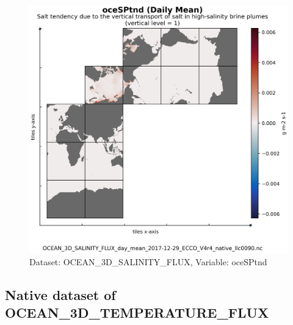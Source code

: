 \begin{figure}[H]
\centering
\includegraphics[scale=0.55]{../images/plots/native_plots/Ocean_Three-Dimensional_Salinity_Fluxes/oceSPtnd.png}
\caption{Dataset: OCEAN\_3D\_SALINITY\_FLUX, Variable: oceSPtnd}
\label{tab:table-OCEAN_3D_SALINITY_FLUX_oceSPtnd-Plot}
\end{figure}
\newpage
\subsection{Native dataset of OCEAN\_3D\_TEMPERATURE\_FLUX}
\newp
